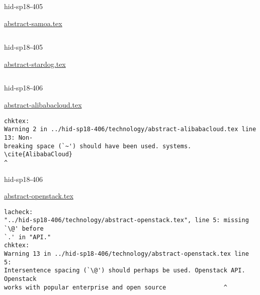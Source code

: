 

\begin{IU}

hid-sp18-405

\href{https://github.com/cloudmesh-community/hid-sp18-405/blob/master//technology/abstract-samoa.tex}{abstract-samoa.tex}

\begin{tiny}
\begin{verbatim}
\end{verbatim}
\end{tiny}
\end{IU}



\begin{IU}

hid-sp18-405

\href{https://github.com/cloudmesh-community/hid-sp18-405/blob/master//technology/abstract-stardog.tex}{abstract-stardog.tex}

\begin{tiny}
\begin{verbatim}
\end{verbatim}
\end{tiny}
\end{IU}



\begin{IU}

hid-sp18-406

\href{https://github.com/cloudmesh-community/hid-sp18-406/blob/master//technology/abstract-alibabacloud.tex}{abstract-alibabacloud.tex}

\begin{tiny}
\begin{verbatim}
chktex:
Warning 2 in ../hid-sp18-406/technology/abstract-alibabacloud.tex line 13: Non-
breaking space (`~') should have been used. systems. \cite{AlibabaCloud}
^
\end{verbatim}
\end{tiny}
\end{IU}



\begin{IU}

hid-sp18-406

\href{https://github.com/cloudmesh-community/hid-sp18-406/blob/master//technology/abstract-openstack.tex}{abstract-openstack.tex}

\begin{tiny}
\begin{verbatim}
lacheck:
"../hid-sp18-406/technology/abstract-openstack.tex", line 5: missing `\@' before
`.' in "API."
chktex:
Warning 13 in ../hid-sp18-406/technology/abstract-openstack.tex line 5:
Intersentence spacing (`\@') should perhaps be used. Openstack API. Openstack
works with popular enterprise and open source                ^
\end{verbatim}
\end{tiny}
\end{IU}

